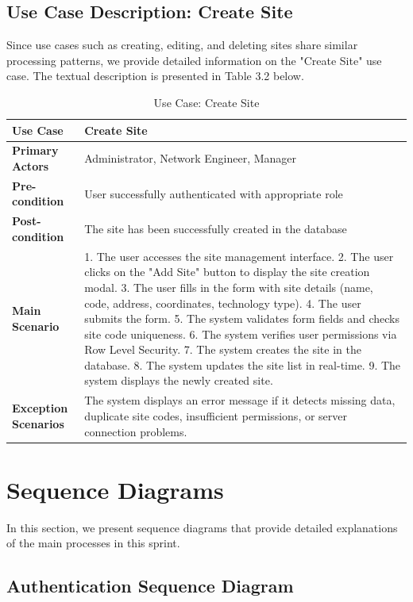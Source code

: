\subsection{Use Case Description: Create Site}

Since use cases such as creating, editing, and deleting sites share similar processing patterns, we provide detailed information on the "Create Site" use case. The textual description is presented in Table 3.2 below.

\begin{table}[H]
\centering
\begin{tabular}{|p{3.5cm}|p{8cm}|}
\hline
\textbf{Use Case} & Create Site \\
\hline
\textbf{Primary Actors} & Administrator, Network Engineer, Manager \\
\hline
\textbf{Pre-condition} & User successfully authenticated with appropriate role \\
\hline
\textbf{Post-condition} & The site has been successfully created in the database \\
\hline
\textbf{Main Scenario} & 
1. The user accesses the site management interface.
2. The user clicks on the "Add Site" button to display the site creation modal.
3. The user fills in the form with site details (name, code, address, coordinates, technology type).
4. The user submits the form.
5. The system validates form fields and checks site code uniqueness.
6. The system verifies user permissions via Row Level Security.
7. The system creates the site in the database.
8. The system updates the site list in real-time.
9. The system displays the newly created site.
\\
\hline
\textbf{Exception Scenarios} & 
The system displays an error message if it detects missing data, duplicate site codes, insufficient permissions, or server connection problems.
\\
\hline
\end{tabular}
\caption{Use Case: Create Site}
\label{tab:create_site_usecase}
\end{table}

\section{Sequence Diagrams}

In this section, we present sequence diagrams that provide detailed explanations of the main processes in this sprint.

\subsection{Authentication Sequence Diagram}

